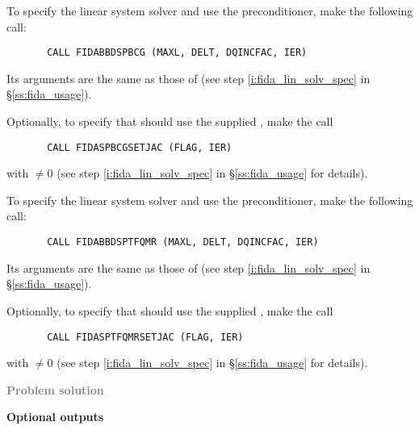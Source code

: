 \begin{Steps}
  To specify the {\spbcg} linear system solver and use the {\idabbdpre}
  preconditioner, make the following call:
\begin{verbatim}
       CALL FIDABBDSPBCG (MAXL, DELT, DQINCFAC, IER)
\end{verbatim}
  Its arguments are the same as those of 
  (see step \ref{i:fida_lin_solv_spec} in \S\ref{ss:fida_usage}).


  Optionally, to specify that {\spbcg} should use the supplied , 
  make the call
\begin{verbatim}
       CALL FIDASPBCGSETJAC (FLAG, IER)
\end{verbatim}
  with  $\neq 0$ 
  (see step \ref{i:fida_lin_solv_spec} in \S\ref{ss:fida_usage} for details).

  To specify the {\sptfqmr} linear system solver and use the {\idabbdpre}
  preconditioner, make the following call:
\begin{verbatim}
       CALL FIDABBDSPTFQMR (MAXL, DELT, DQINCFAC, IER)
\end{verbatim}
  Its arguments are the same as those of 
  (see step \ref{i:fida_lin_solv_spec} in \S\ref{ss:fida_usage}).


  Optionally, to specify that {\sptfqmr} should use the supplied , 
  make the call
\begin{verbatim}
       CALL FIDASPTFQMRSETJAC (FLAG, IER)
\end{verbatim}
  with  $\neq 0$ 
  (see step \ref{i:fida_lin_solv_spec} in \S\ref{ss:fida_usage} for details).

\item \textcolor{gray}{\bf Problem solution}
  
\item {\bf {\idabbdpre} Optional outputs}


\end{Steps}
